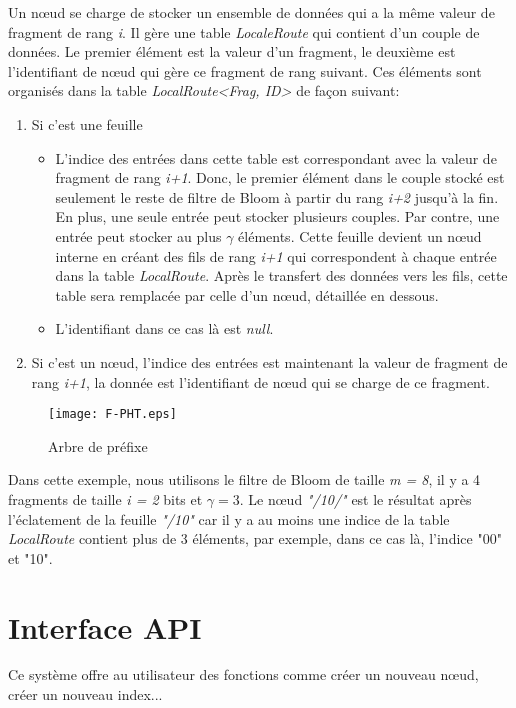 \documentclass[a4paper,11pt]{report}
\begin{document}
	Un nœud se charge de stocker un ensemble de données qui a la même valeur de fragment de rang \textit{i}. Il gère une table \textit{LocaleRoute} qui contient d'un couple de données. Le premier élément est la valeur d'un fragment, le deuxième est l'identifiant de nœud qui gère ce fragment de rang suivant. Ces éléments sont organisés dans la table \textit{LocalRoute<Frag, ID>} de façon suivant:
	\begin{enumerate}
		\item Si c'est une feuille
			\begin{itemize}
				\item L'indice des entrées dans cette table est correspondant avec la valeur de fragment de rang \textit{i+1}. Donc, le premier élément dans le couple stocké est seulement le reste de filtre de Bloom à partir du rang \textit{i+2} jusqu'à la fin. En plus, une seule entrée peut stocker plusieurs couples. Par contre, une entrée peut stocker au plus $\gamma$ éléments. Cette feuille devient un nœud interne en créant des fils de rang \textit{i+1} qui correspondent à chaque entrée dans la table \textit{LocalRoute}. Après le transfert des données vers les fils, cette table sera remplacée par celle d'un nœud, détaillée en dessous.
				\item L'identifiant dans ce cas là est \textit{null}.
			\end{itemize}
		\item Si c'est un nœud, l'indice des entrées est maintenant la valeur de fragment de rang \textit{i+1}, la donnée est l'identifiant de nœud qui se charge de ce fragment.
	\end{enumerate}	
		
	\begin{figure}[!htbp]
	\centering
	\texttt{[image: F-PHT.eps]}
	\caption{Arbre de préfixe}
	\label{F-PHT}
	\end{figure}	

\newpage	

	Dans cette exemple, nous utilisons le filtre de Bloom de taille \textit{m = 8}, il y a 4 fragments de taille \textit{i = 2} bits et $\gamma = 3$. Le nœud \textit{"/10/"} est le résultat après l'éclatement de la feuille \textit{"/10"} car il y a au moins une indice de la table \textit{LocalRoute} contient plus de 3 éléments, par exemple, dans ce cas là, l'indice "00" et "10".

\section{Interface API}
	Ce système offre au utilisateur des fonctions comme créer un nouveau nœud, créer un nouveau index...
	
\end{document}
